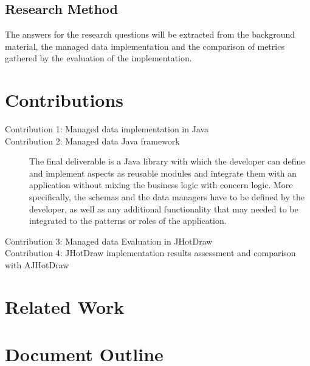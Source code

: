 \subsection{Research Method}\label{Research Method}
The answers for the research questions will be extracted from the background material, the managed data implementation and the comparison of metrics gathered by the evaluation of the implementation. 

\section{Contributions}\label{Contributions}

\begin{description}
  \item[Contribution 1: Managed data implementation in Java]

  \item[Contribution 2: Managed data Java framework]
  The final deliverable is a Java library with which the developer can define and implement aspects as reusable modules
and integrate them with an application without mixing the business logic with concern logic.
More specifically, the schemas and the data managers have to be defined by the developer, as well as any additional
functionality that may needed to be integrated to the patterns or roles of the application.

  \item[Contribution 3: Managed data Evaluation in JHotDraw]

  \item[Contribution 4: JHotDraw implementation results assessment and comparison with AJHotDraw]

\end{description}

\section{Related Work}\label{Related Work}

\section{Document Outline}\label{Document Outline}
